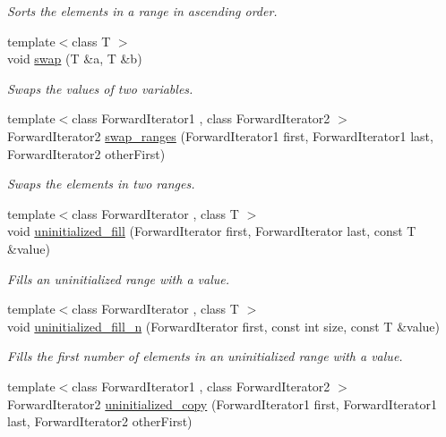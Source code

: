 \begin{DoxyCompactItemize}
\begin{DoxyCompactList}\small\item\em Sorts the elements in a range in ascending order. \end{DoxyCompactList}\item 
{\footnotesize template$<$class T $>$ }\\void \hyperlink{namespaceprism_a6430516ab4f2e2a7f43323acb6b559d8}{swap} (T \&a, T \&b)
\begin{DoxyCompactList}\small\item\em Swaps the values of two variables. \end{DoxyCompactList}\item 
{\footnotesize template$<$class Forward\+Iterator1 , class Forward\+Iterator2 $>$ }\\Forward\+Iterator2 \hyperlink{namespaceprism_a4661f2c0c4dca098c137179b4d93f3dc}{swap\+\_\+ranges} (Forward\+Iterator1 first, Forward\+Iterator1 last, Forward\+Iterator2 other\+First)
\begin{DoxyCompactList}\small\item\em Swaps the elements in two ranges. \end{DoxyCompactList}\item 
{\footnotesize template$<$class Forward\+Iterator , class T $>$ }\\void \hyperlink{namespaceprism_a8234c2c7917f750db94bb068d6fd554e}{uninitialized\+\_\+fill} (Forward\+Iterator first, Forward\+Iterator last, const T \&value)
\begin{DoxyCompactList}\small\item\em Fills an uninitialized range with a value. \end{DoxyCompactList}\item 
{\footnotesize template$<$class Forward\+Iterator , class T $>$ }\\void \hyperlink{namespaceprism_a5485ae7bad862f6ff0ab363ed4697b61}{uninitialized\+\_\+fill\+\_\+n} (Forward\+Iterator first, const int size, const T \&value)
\begin{DoxyCompactList}\small\item\em Fills the first number of elements in an uninitialized range with a value. \end{DoxyCompactList}\item 
{\footnotesize template$<$class Forward\+Iterator1 , class Forward\+Iterator2 $>$ }\\Forward\+Iterator2 \hyperlink{namespaceprism_a5ff56f151fea6e709350a0e9fbdb70a8}{uninitialized\+\_\+copy} (Forward\+Iterator1 first, Forward\+Iterator1 last, Forward\+Iterator2 other\+First)

\end{DoxyCompactItemize}

